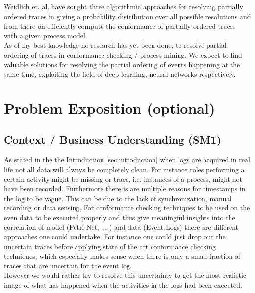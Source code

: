 \documentclass[
	a4paper,
	pagesize,
	pdftex,
	12pt,
	ngerman,
	fleqn,
	final,
	]{scrartcl}
\theoremstyle{plain}
\theoremstyle{definition}
\begin{document}
	Weidlich et. al. have sought three algorithmic approaches for resolving partially ordered traces in giving a probability distribution over all possible resolutions and from there on efficiently compute the conformance of partially ordered traces with a given process model.\cite{self} \\
	As of my best knowledge no research has yet been done, to resolve partial ordering of traces in conformance checking / process mining. We expect to find valuable solutions for resolving the partial ordering of events happening at the same time, exploiting the field of deep learning, neural networks respectively. \\

	
\section{Problem Exposition (optional)}
	
	
	\subsection{Context / Business Understanding (SM1)}
	As stated in the the Introduction \ref{sec:introduction} when logs are acquired in real life not all data will 
	always be completely clean. For instance roles performing a certain activity might be missing or trace, i.e. instances
	of a process, might not have been recorded. Furthermore there is are multiple reasons for timestamps in the log to be vague. This can be due to the lack of synchronization, manual recording or data sensing. \cite{self}
	For conformance checking techniques to be used on the even data to be executed properly and thus give meaningful insights into the correlation of model (Petri Net, ... ) and data (Event Logs) there are different approaches one could undertake. For instance one could just drop out the uncertain traces before applying state of the art conformance checking techniques, which especially makes sense when there is only a small fraction of traces that are uncertain for the event log. \\ However we would rather try to resolve this uncertainty to get the most realistic image of what has happened when the activities in the logs had been executed. 
	
\end{document}

